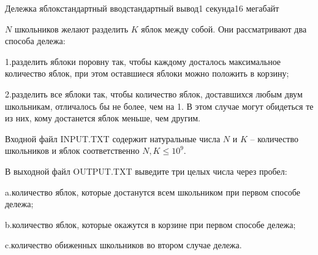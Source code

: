 \begin{problem}{Дележка яблок}{стандартный ввод}{стандартный вывод}{1 секунда}{16 мегабайт}

$N$ школьников желают разделить $K$ яблок между собой. Они рассматривают два способа дележа:

1.разделить яблоки поровну так, чтобы каждому досталось максимальное количество яблок, при этом оставшиеся яблоки можно положить в корзину;

2.разделить все яблоки так, чтобы количество яблок, доставшихся любым двум школьникам, отличалось бы не более, чем на 1. В этом случае могут обидеться те из них, кому достанется яблок меньше, чем другим.

\InputFile
Входной файл INPUT.TXT содержит натуральные числа $N$ и $K$ -- количество школьников и яблок соответственно $N, K \leq 10^9$.

\OutputFile
В выходной файл OUTPUT.TXT выведите три целых числа через пробел:

a.количество яблок, которые достанутся всем школьником при первом способе дележа;

b.количество яблок, которые окажутся в корзине при первом способе дележа;

c.количество обиженных школьников во втором случае дележа.

\Examples

\begin{example}
%
%
\end{example}

\end{problem}

